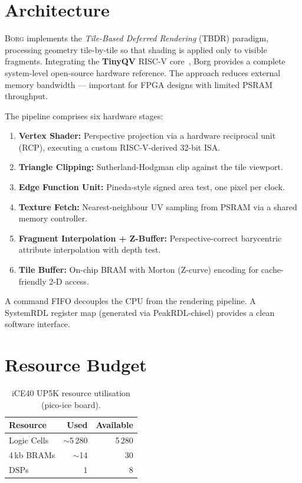 \documentclass[sigconf,review,natbib=false]{acmart}
\begin{document}
\section{Architecture}

\textsc{Borg} implements the \emph{Tile-Based Deferred Rendering} (TBDR)
paradigm, processing geometry tile-by-tile so that shading is applied
only to visible fragments.
Integrating the \textbf{TinyQV} RISC-V core~\cite{Bell2024TinyQV}, Borg provides a complete system-level open-source hardware reference.
The approach reduces external memory bandwidth — important
for FPGA designs with limited PSRAM throughput.

The pipeline comprises six hardware stages:
\begin{enumerate}
  \item \textbf{Vertex Shader:} Perspective projection via a hardware
    reciprocal unit (RCP), executing a custom RISC-V-derived 32-bit ISA.
  \item \textbf{Triangle Clipping:} Sutherland-Hodgman clip against
    the tile viewport.
  \item \textbf{Edge Function Unit:} Pineda-style signed area test,
    one pixel per clock.
  \item \textbf{Texture Fetch:} Nearest-neighbour UV sampling from PSRAM
    via a shared memory controller.
  \item \textbf{Fragment Interpolation + Z-Buffer:} Perspective-correct
    barycentric attribute interpolation with depth test.
  \item \textbf{Tile Buffer:} On-chip BRAM with Morton (Z-curve) encoding
    for cache-friendly 2-D access.
\end{enumerate}

A command FIFO decouples the CPU from the rendering pipeline.
A SystemRDL register map (generated via PeakRDL-chisel) provides
a clean software interface.

\section{Resource Budget}

\begin{table}[h]
  \centering
  \caption{iCE40 UP5K resource utilisation (pico-ice board).}
  \begin{tabular}{@{}lrr@{}}
    \toprule
    Resource & Used & Available \\
    \midrule
    Logic Cells & $\sim$5\,280 & 5\,280 \\
    4\,kb BRAMs & $\sim$14     & 30 \\
    DSPs        & 1            & 8 \\
    \bottomrule
  \end{tabular}
\end{table}
\end{document}
